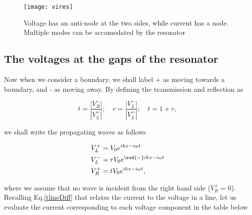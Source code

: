  \begin{figure}
   \texttt{[image: vires]}
   \caption{Voltage has an anti-node at  the two sides, while current
     has  a  node.    Multiple  modes  can  be   accomodated  by  the
     resonator\label{tlineVI}}
 \end{figure}

 \subsection{The voltages at the gaps of the resonator}
 Now when we consider a boundary,  we shall label + as moving towards
 a boundary, and - as moving  away.  By defining the transmission and
 reflection as

 \begin{equation}
   t=\frac{|V_{R}^{-}|}{|V_{L}^{+}|};\quad r=\frac{|V_{L}^{-}|}{|V_{L}^{+}|};\quad t=1+r,
 \end{equation}

 \noindent we shall write the propagating waves as follows

 \begin{align}
   V_L^{+} & = V_0e^{ikx-i\omega t}\\
   V_L^{-} & = rV_0e^{\red{-}ikx-i\omega t}\\
   V_R^{+} & = tV_0e^{ikx-i\omega t},
 \end{align}

 \noindent where  we assume that no  wave is incident from  the right
 hand  side ($  V_R^{+}=0  $).   Recalling Eq.\eqref{tlineDiff}  that
 relates the  current to the voltage  in a line, let  us evaluate the
 current corresponding to each voltage component in the table below

